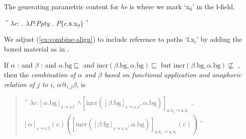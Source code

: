 The generating parametric content for \textit{he} is \nexteg{} where we
mark `x$_0$' in the $\mathfrak{l}$-field.
\begin{ex} 
  $\ulcorner\lambda c$: . $\lambda
  P$:\textit{Ppty} . $P\{c.\mathfrak{s}.\text{x}_0\}\urcorner$
\end{ex} 
We adjust (\ref{ex:combine-align}) to include reference to paths
`$\mathfrak{l}$.x$_i$' by adding the boxed material as in \nexteg{}.
\begin{ex} 
If $\alpha$ :  
and $\beta$ : 
and $\alpha.\text{bg}\sqsubseteq$  and
  $\mathrm{incr}(\beta.\text{bg},\alpha.\text{bg})\sqsubseteq$
   but $\mathrm{incr}(\beta.\text{bg},\alpha.\text{bg})\not\sqsubseteq$
   ,
                         then the \textit{combination of $\alpha$ and
    $\beta$  based on functional application and anaphoric
      relation of $j$ to $i$}, $\alpha\text{@}_{i,j}\beta$, is
  \begin{quote}
    $\ulcorner\lambda c$:$[\alpha.\text{bg}]_{\mathfrak{c}\leadsto\mathfrak{c}.\text{f}}$
      \d{$\wedge$}$[\mathrm{incr}([\beta.\text{bg}]_{\mathfrak{c}\leadsto\mathfrak{c}.\text{a}},\alpha.\text{bg})]_{\mathfrak{s}.\text{x}_j\leadsto\mathfrak{s}.\text{x}_i}$
      . \\ \hspace*{2em}$[\alpha]_{\mathfrak{c}\leadsto\mathfrak{c}.\text{f}}(c)([\mathrm{incr}([\beta.\text{fg}]_{\mathfrak{c}\leadsto\mathfrak{c}.\text{a}},\alpha.\text{bg})]_{\mathfrak{s}.\text{x}_j\leadsto\mathfrak{s}.\text{x}_i}(c))\urcorner$
\end{quote}

\label{ex:combine-align-local}

\end{ex} 
